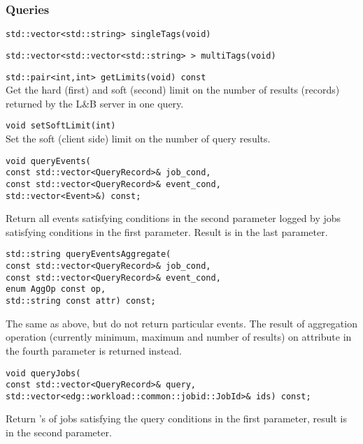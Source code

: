 \documentclass{egee}
\def\LB{L\&B\xspace}
\begin{document}
\subsubsection*{Queries}
\begin{description}
\item{\verb|std::vector<std::string> singleTags(void)|}\\
\item{\verb|std::vector<std::vector<std::string> > multiTags(void)|}\\

\item{\verb|std::pair<int,int> getLimits(void) const|}\\
Get the hard (first) and soft (second) limit on the number of results
(records) returned by the \LB server in one query.

\item{\verb|void setSoftLimit(int)|}\\
Set the soft (client side) limit on the number of query results.

\item{
\begin{verbatim}
void queryEvents(
const std::vector<QueryRecord>& job_cond,
const std::vector<QueryRecord>& event_cond,
std::vector<Event>&) const;
\end{verbatim}
}
Return all events satisfying conditions in the second parameter logged
by jobs satisfying conditions in the first parameter. Result is in the
last parameter.

\item{
\begin{verbatim}
std::string queryEventsAggregate(
const std::vector<QueryRecord>& job_cond,
const std::vector<QueryRecord>& event_cond,
enum AggOp const op,
std::string const attr) const;
\end{verbatim}
}
The same as above, but do not return particular events. The result of
aggregation operation (currently minimum, maximum and number of
results) on attribute in the fourth parameter is returned instead.

\item{
\begin{verbatim}
void queryJobs(
const std::vector<QueryRecord>& query,
std::vector<edg::workload::common::jobid::JobId>& ids) const;
\end{verbatim}
}
Return \jobid's of jobs satisfying the query conditions in the first
parameter, result is in the second parameter.


\end{description}
\end{document}
